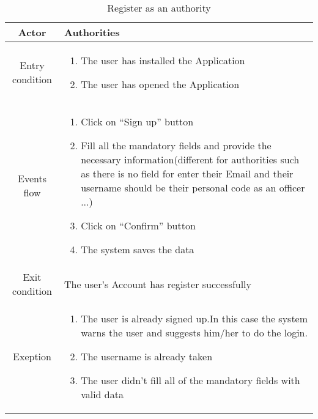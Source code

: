\documentclass{article}
\begin{document}
		\begin{table} [H]
		\begin{center}
		\caption{Register as an authority}
		\begin{tabular}{|c|p{8cm}|}
			\hline
			Actor&Authorities\\
			\hline
			Entry condition&\begin{enumerate}
								\item The user has installed the Application
								\item The user has opened the Application
							\end{enumerate}\\
			\hline
			Events flow & \begin{enumerate}
							\item Click on “Sign up” button
							\item Fill all the mandatory fields and provide the necessary information(different for authorities such as there is no field for enter their Email and their username should be their personal code as an officer ...)
							\item Click on “Confirm” button
							\item The system saves the data
						\end{enumerate}\\
			\hline
			Exit condition& The user's Account has register successfully\\
			\hline
			Exeption& \begin{enumerate}
							\item The user is already signed up.In this case the system warns the user and suggests him/her to do the login.
							\item The username is already taken
							\item The user didn’t fill all of the mandatory fields with valid data
						\end{enumerate}\\
			\hline
		\end{tabular}
		\end{center}
		\end{table} 
	
\end{document}
